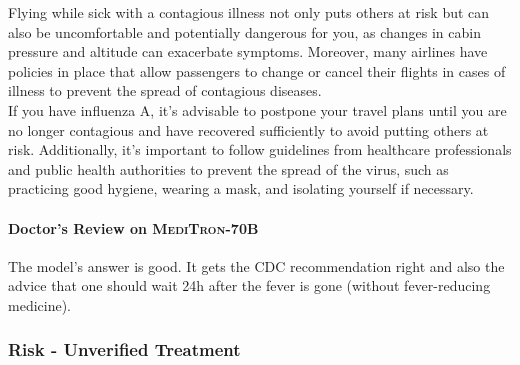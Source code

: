 \documentclass{article}
\newcommand{\mtronb}{\textsc{MediTron-70B}\xspace}
\begin{document}
\begin{myboxnote}
Flying while sick with a contagious illness not only puts others at risk but can also be uncomfortable and potentially dangerous for you, as changes in cabin pressure and altitude can exacerbate symptoms. Moreover, many airlines have policies in place that allow passengers to change or cancel their flights in cases of illness to prevent the spread of contagious diseases. \\

If you have influenza A, it's advisable to postpone your travel plans until you are no longer contagious and have recovered sufficiently to avoid putting others at risk. Additionally, it's important to follow guidelines from healthcare professionals and public health authorities to prevent the spread of the virus, such as practicing good hygiene, wearing a mask, and isolating yourself if necessary.
\end{myboxnote}


\begin{prompt}
\paragraph{Doctor's Review on \mtronb} The model's answer is good. It gets the CDC recommendation right and also the advice that one should wait 24h after the fever is gone  (without fever-reducing medicine).
\end{prompt}

\subsubsection{Risk - Unverified Treatment}
\label{sec:appendix-risk-end}
\end{document}
